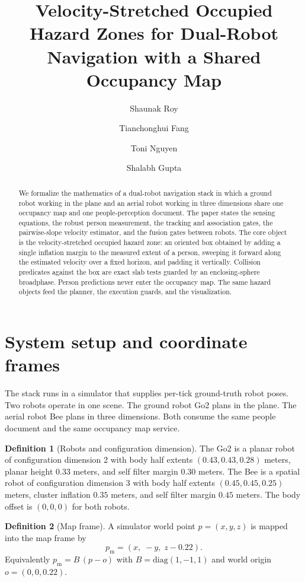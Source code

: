\documentclass[10pt,a4paper]{article}
\title{Velocity-Stretched Occupied Hazard Zones for Dual-Robot Navigation with a Shared Occupancy Map}
\author{Shaunak Roy \and Tianchonghui Fang \and Toni Nguyen \and Shalabh Gupta}
\date{}
\theoremstyle{plain}
\theoremstyle{definition}
\newtheorem{definition}{Definition}[section]
\theoremstyle{remark}
\begin{document}
\maketitle

\begin{abstract}
We formalize the mathematics of a dual-robot navigation stack in which a ground robot working in the plane and an aerial robot working in three dimensions share one occupancy map and one people-perception document. The paper states the sensing equations, the robust person measurement, the tracking and association gates, the pairwise-slope velocity estimator, and the fusion gates between robots. The core object is the velocity-stretched occupied hazard zone: an oriented box obtained by adding a single inflation margin to the measured extent of a person, sweeping it forward along the estimated velocity over a fixed horizon, and padding it vertically. Collision predicates against the box are exact slab tests guarded by an enclosing-sphere broadphase. Person predictions never enter the occupancy map. The same hazard objects feed the planner, the execution guards, and the visualization.
\end{abstract}

\section{System setup and coordinate frames}

The stack runs in a simulator that supplies per-tick ground-truth robot poses. Two robots operate in one scene. The ground robot Go2 plans in the plane. The aerial robot Bee plans in three dimensions. Both consume the same people document and the same occupancy map service.

\begin{definition}[Robots and configuration dimension]\label{def:robots}
The Go2 is a planar robot of configuration dimension 2 with body half extents $(0.43, 0.43, 0.28)$ meters, planar height $0.33$ meters, and self filter margin $0.30$ meters. The Bee is a spatial robot of configuration dimension 3 with body half extents $(0.45, 0.45, 0.25)$ meters, cluster inflation $0.35$ meters, and self filter margin $0.45$ meters. The body offset is $(0,0,0)$ for both robots.
\end{definition}

\begin{definition}[Map frame]\label{def:mapframe}
A simulator world point $p = (x, y, z)$ is mapped into the map frame by
\begin{equation}
p_{\mathrm{m}} = (x,\; -y,\; z - 0.22).
\end{equation}
Equivalently $p_{\mathrm{m}} = B\,(p - o)$ with $B = \mathrm{diag}(1, -1, 1)$ and world origin $o = (0, 0, 0.22)$.
\end{definition}
\end{document}
